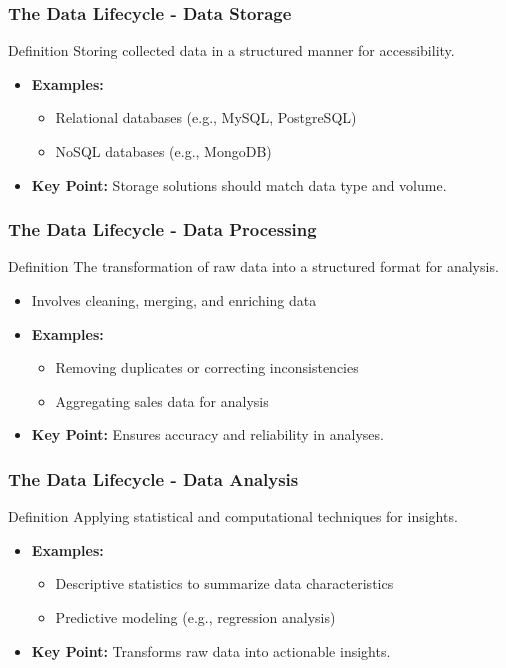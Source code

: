 \documentclass[aspectratio=169]{beamer}
\begin{document}
\begin{frame}[fragile]
    \frametitle{The Data Lifecycle - Data Storage}
    \begin{block}{Definition}
        Storing collected data in a structured manner for accessibility.
    \end{block}
    \begin{itemize}
        \item \textbf{Examples:}
        \begin{itemize}
            \item Relational databases (e.g., MySQL, PostgreSQL)
            \item NoSQL databases (e.g., MongoDB)
        \end{itemize}
        \item \textbf{Key Point:} Storage solutions should match data type and volume.
    \end{itemize}
\end{frame}

\begin{frame}[fragile]
    \frametitle{The Data Lifecycle - Data Processing}
    \begin{block}{Definition}
        The transformation of raw data into a structured format for analysis.
    \end{block}
    \begin{itemize}
        \item Involves cleaning, merging, and enriching data
        \item \textbf{Examples:}
        \begin{itemize}
            \item Removing duplicates or correcting inconsistencies
            \item Aggregating sales data for analysis
        \end{itemize}
        \item \textbf{Key Point:} Ensures accuracy and reliability in analyses.
    \end{itemize}
\end{frame}

\begin{frame}[fragile]
    \frametitle{The Data Lifecycle - Data Analysis}
    \begin{block}{Definition}
        Applying statistical and computational techniques for insights.
    \end{block}
    \begin{itemize}
        \item \textbf{Examples:}
        \begin{itemize}
            \item Descriptive statistics to summarize data characteristics
            \item Predictive modeling (e.g., regression analysis)
        \end{itemize}
        \item \textbf{Key Point:} Transforms raw data into actionable insights.
    \end{itemize}
\end{frame}
\end{document}
